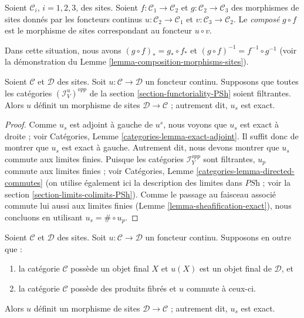 \begin{definition}
\label{definition-composition-morphisms-sites}
Soient $\mathcal{C}_i$, $i = 1, 2, 3$, des sites. Soient
$f : \mathcal{C}_1 \to \mathcal{C}_2$ et
$g : \mathcal{C}_2 \to \mathcal{C}_3$ des morphismes de sites
donnés par les foncteurs continus $u : \mathcal{C}_2 \to \mathcal{C}_1$
et $v : \mathcal{C}_3 \to \mathcal{C}_2$. Le {\it composé}
$g \circ f$ est le morphisme de sites correspondant au
foncteur $u \circ v$.
\end{definition}

\noindent
Dans cette situation, nous avons $(g \circ f)_* = g_* \circ f_*$ et
$(g \circ f)^{-1} = f^{-1} \circ g^{-1}$ (voir la démonstration du
Lemme \ref{lemma-composition-morphisms-sites}).

\begin{lemma}
\label{lemma-directed-morphism}
Soient $\mathcal{C}$ et $\mathcal{D}$ des sites. Soit
$u : \mathcal{C} \to \mathcal{D}$ un foncteur continu.
Supposons que toutes les catégories $(\mathcal{I}_V^u)^{opp}$ de la
section \ref{section-functoriality-PSh}
soient filtrantes. Alors $u$ définit un morphisme de sites $\mathcal{D} \to
\mathcal{C}$ ; autrement dit, $u_s$ est exact.
\end{lemma}

\begin{proof}
Comme $u_s$ est adjoint à gauche de $u^s$, nous voyons que $u_s$ est exact à droite ;
voir Catégories, Lemme \ref{categories-lemma-exact-adjoint}.
Il suffit donc de montrer que $u_s$ est exact à gauche. Autrement dit,
nous devons montrer que $u_s$ commute aux limites finies.
Puisque les catégories $\mathcal{I}_Y^{opp}$ sont filtrantes,
$u_p$ commute aux limites finies ; voir
Catégories, Lemme \ref{categories-lemma-directed-commutes}
(on utilise également ici la description des limites dans $\textit{PSh}$ ;
voir la section \ref{section-limits-colimits-PSh}).
Comme le passage au faisceau associé commute lui aussi aux limites finies
(Lemme \ref{lemma-sheafification-exact}), nous concluons en utilisant
$u_s = \# \circ u_p$.
\end{proof}

\begin{proposition}
\label{proposition-get-morphism}
Soient $\mathcal{C}$ et $\mathcal{D}$ des sites. Soit
$u : \mathcal{C} \to \mathcal{D}$ un foncteur continu.
Supposons en outre que :
\begin{enumerate}
\item la catégorie $\mathcal{C}$ possède un objet final $X$ et
$u(X)$ est un objet final de $\mathcal{D}$, et
\item la catégorie $\mathcal{C}$ possède des produits fibrés et
$u$ commute à ceux-ci.
\end{enumerate}
Alors $u$ définit un morphisme de sites $\mathcal{D} \to
\mathcal{C}$ ; autrement dit, $u_s$ est exact.
\end{proposition}

